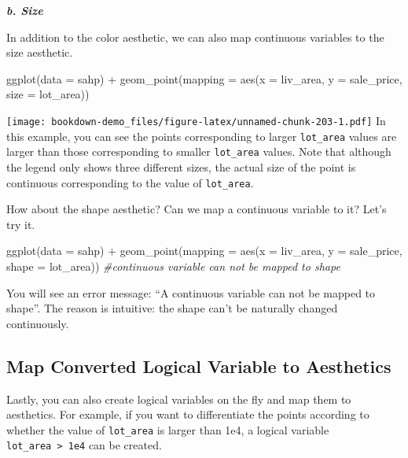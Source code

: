 \documentclass[
]{book}
\newenvironment{Shaded}{\begin{snugshade}}{\end{snugshade}}
\newcommand{\AttributeTok}[1]{\textcolor[rgb]{0.77,0.63,0.00}{#1}}
\newcommand{\CommentTok}[1]{\textcolor[rgb]{0.56,0.35,0.01}{\textit{#1}}}
\newcommand{\FunctionTok}[1]{\textcolor[rgb]{0.00,0.00,0.00}{#1}}
\newcommand{\NormalTok}[1]{#1}
\newcommand{\SpecialCharTok}[1]{\textcolor[rgb]{0.00,0.00,0.00}{#1}}
\begin{document}
\textbf{\emph{b. Size}}

In addition to the color aesthetic, we can also map continuous variables to the size aesthetic.

\begin{Shaded}
\begin{Highlighting}[]
\FunctionTok{ggplot}\NormalTok{(}\AttributeTok{data =}\NormalTok{ sahp) }\SpecialCharTok{+} \FunctionTok{geom\_point}\NormalTok{(}\AttributeTok{mapping =} \FunctionTok{aes}\NormalTok{(}\AttributeTok{x =}\NormalTok{ liv\_area, }\AttributeTok{y =}\NormalTok{ sale\_price, }\AttributeTok{size =}\NormalTok{ lot\_area))}
\end{Highlighting}
\end{Shaded}

\texttt{[image: bookdown-demo\_files/figure-latex/unnamed-chunk-203-1.pdf]}
In this example, you can see the points corresponding to larger \texttt{lot\_area} values are larger than those corresponding to smaller \texttt{lot\_area} values. Note that although the legend only shows three different sizes, the actual size of the point is continuous corresponding to the value of \texttt{lot\_area}.

How about the shape aesthetic? Can we map a continuous variable to it? Let's try it.

\begin{Shaded}
\begin{Highlighting}[]
\FunctionTok{ggplot}\NormalTok{(}\AttributeTok{data =}\NormalTok{ sahp) }\SpecialCharTok{+} \FunctionTok{geom\_point}\NormalTok{(}\AttributeTok{mapping =} \FunctionTok{aes}\NormalTok{(}\AttributeTok{x =}\NormalTok{ liv\_area, }\AttributeTok{y =}\NormalTok{ sale\_price, }\AttributeTok{shape =}\NormalTok{ lot\_area)) }\CommentTok{\#continuous variable can not be mapped to shape}
\end{Highlighting}
\end{Shaded}

You will see an error message: ``A continuous variable can not be mapped to shape''. The reason is intuitive: the shape can't be naturally changed continuously.

\hypertarget{map-converted-logical-variable-to-aesthetics}{%
\subsection{Map Converted Logical Variable to Aesthetics}\label{map-converted-logical-variable-to-aesthetics}}

Lastly, you can also create logical variables on the fly and map them to aesthetics. For example, if you want to differentiate the points according to whether the value of \texttt{lot\_area} is larger than 1e4, a logical variable \texttt{lot\_area\ \textgreater{}\ 1e4} can be created.
\end{document}
